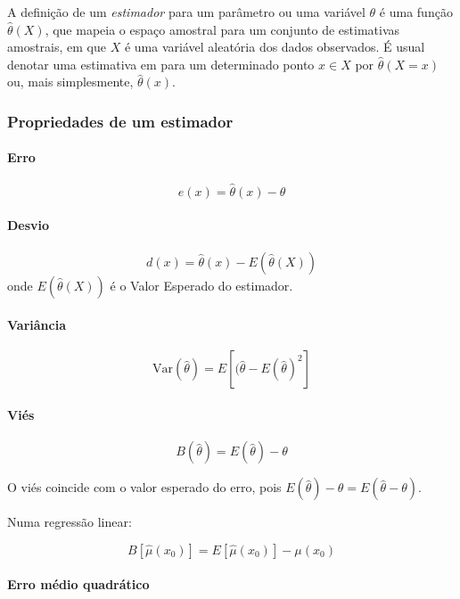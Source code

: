 \documentclass[a4paper]{article}
\let\oldparagraph\paragraph
\renewcommand{\paragraph}[1]{\oldparagraph{#1}\mbox{}}
\begin{document}
A definição de um \emph{estimador} para um parâmetro ou uma variável
\(\theta\) é uma função \(\hat{\theta}(X)\), que mapeia o espaço
amostral para um conjunto de estimativas amostrais, em que \(X\) é uma
variável aleatória dos dados observados. É usual denotar uma estimativa
em para um determinado ponto \(x \in X\) por \(\hat{\theta}(X = x)\) ou,
mais simplesmente, \(\hat{\theta}(x)\).

\subsubsection{Propriedades de um
estimador}\label{propriedades-de-um-estimador}

\paragraph{Erro}\label{erro}

\[e(x) = \hat{\theta}(x) - \theta\]

\paragraph{Desvio}\label{desvio}

\[d(x) = \hat{\theta}(x) - E(\hat{\theta}(X))\] onde
\(E(\hat{\theta}(X))\) é o Valor Esperado do estimador.

\paragraph{Variância}\label{variancia}

\[\text{Var}(\hat{\theta}) = E[(\hat{\theta} - E(\hat{\theta})^2]\]

\paragraph{Viés}\label{vies}

\[B(\hat{\theta}) = E(\hat{\theta}) - \theta\]

O viés coincide com o valor esperado do erro, pois
\(E(\hat{\theta}) - \theta = E(\hat{\theta}-\theta)\).

Numa regressão linear:

\[B[\hat{\mu}(x_0)] = E[\hat{\mu}(x_0)] - \mu(x_0)\]

\paragraph{Erro médio quadrático}\label{erro-medio-quadratico}
\end{document}
